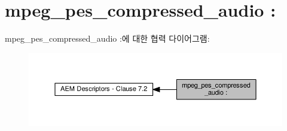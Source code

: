 \hypertarget{group__mpeg__pes__compressed__audio}{}\section{mpeg\+\_\+pes\+\_\+compressed\+\_\+audio \+:}
\label{group__mpeg__pes__compressed__audio}
mpeg\+\_\+pes\+\_\+compressed\+\_\+audio \+:에 대한 협력 다이어그램\+:
\nopagebreak
\begin{figure}[H]
\begin{center}
\leavevmode
\includegraphics[width=350pt]{group__mpeg__pes__compressed__audio}
\end{center}
\end{figure}
